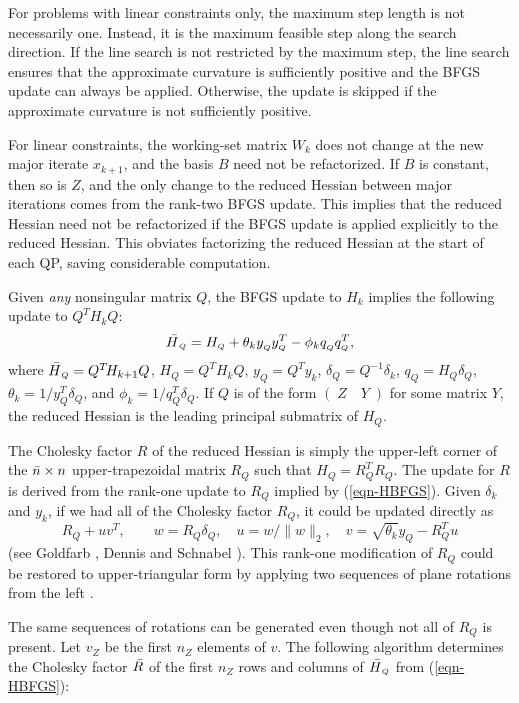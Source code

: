 \documentclass[draft,leqno,onefignum,onetabnum]{siamltex}
\def\drop{^{\null}}
\def\Hbar{\skew5\bar H}
\def\kp#1{_{k+#1}}
\def\mat#1#2{(\; #1 \quad #2 \;)}
\def\nbar{\skew2\bar n}
\def\norm#1{\|#1\|}
\def\Q{_{\scriptscriptstyle Q}}
\def\Rbar{\skew5\bar R}
\def\T{^T\!}
\def\inv{^{-1}}
\def\Z{_{\scriptscriptstyle Z}}
\newcommand{\twonorm}[1]{\norm{#1}_2}
\begin{document}
 For problems with linear constraints only, the maximum step length is
not necessarily one. Instead, it is the maximum feasible step along
the search direction.  If the line search is not restricted by the
maximum step, the line search ensures that the approximate curvature
is sufficiently positive and the BFGS update can always be applied.
Otherwise, the update is skipped if the approximate curvature is not
sufficiently positive.

 For linear constraints, the working-set matrix $W_k$ does not change
at the new major iterate $x\kp1$, and the basis $B$ need not be
refactorized.  If $B$ is constant, then so is $Z$, and the only change
to the reduced Hessian between major iterations comes from the
rank-two BFGS update.  This implies that the reduced Hessian need not
be refactorized if the BFGS update is applied explicitly to the
reduced Hessian.  This obviates factorizing the reduced Hessian at the
start of each QP, saving considerable computation.

Given \emph{any} nonsingular matrix $Q$, the BFGS update to $H_k$
implies the following update to $Q\T H_k Q$:
\begin{equation}                                      \label{eqn-HBFGS}
        \Hbar\Q = H\Q + \theta_k y\Q\drop y\Q^T - \phi_k q\Q\drop q\Q^T,
\end{equation}
where $\Hbar\Q = Q\T H\kp1 Q$, $H\Q = Q\T H_k Q$, $y\Q = Q\T y_k$,
$\delta\Q = Q\inv \delta_k$,
 $q\Q = H\Q \delta\Q$, $\theta_k = 1 / y\Q^T \delta\Q$,
                   and $\phi_k   = 1 / q\Q^T \delta\Q$.
If $Q$ is of the form $\mat{Z}{Y}$ for some matrix $Y$,
the reduced Hessian is the leading principal submatrix of $H\Q$.

 The Cholesky factor $R$ of the reduced Hessian is simply the
upper-left corner of the $\nbar\times n$ upper-trapezoidal matrix
$R\Q$ such that $H\Q = R\Q^T R\Q$.  The update for $R$ is derived from
the rank-one update to $R\Q$ implied by (\ref{eqn-HBFGS}).  Given
$\delta_k$ and $y_k$, if we had all of the Cholesky factor $R\Q$, it could be
updated directly as
$$
        R\Q + uv\T, \qquad
        w = R\Q \delta\Q, \quad
        u = w/\twonorm{w}, \quad
        v = \sqrt{\theta_k} y\Q - R\Q^T u
$$
(see Goldfarb \cite{Gol76a}, Dennis and Schnabel \cite{DS81}).  This
rank-one modification of $R\Q$ could be restored to upper-triangular
form by applying two sequences of plane rotations from the left
\cite{GilGMS74}.

The same sequences of rotations can be generated even though not all
of $R\Q$ is present.  Let $v\Z$ be the first $n\Z$ elements of $v$.
The following algorithm determines the Cholesky factor $\Rbar$ of
the first $n\Z$ rows and columns of $\Hbar\Q$ from (\ref{eqn-HBFGS}):
\end{document}
